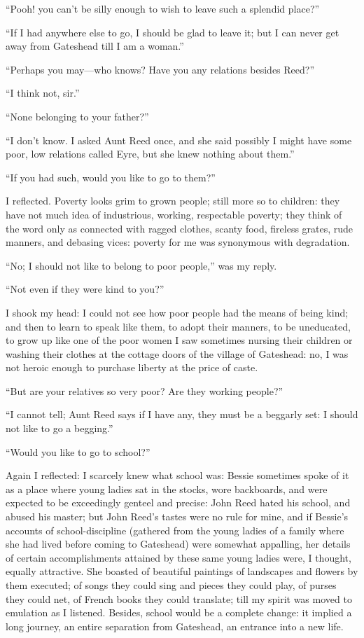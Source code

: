 \enquote{Pooh! you can't be silly enough to wish to leave such a
	splendid place?}

\enquote{If I had anywhere else to go, I should be glad to leave it; but
	I can never get away from Gateshead till I am a woman.}

\enquote{Perhaps you may---who knows?  Have you any relations besides
	\Mrs{} Reed?}

\enquote{I think not, sir.}

\enquote{None belonging to your father?}

\enquote{I don't know.  I asked Aunt Reed once, and she said possibly I
	might have some poor, low relations called Eyre, but she knew nothing
	about them.}

\enquote{If you had such, would you like to go to them?}

I reflected.  Poverty looks grim to grown people; still more so to
children: they have not much idea of industrious, working, respectable
poverty; they think of the word only as connected with ragged clothes,
scanty food, fireless grates, rude manners, and debasing vices: poverty
for me was synonymous with degradation.

\enquote{No; I should not like to belong to poor people,} was my reply.

\enquote{Not even if they were kind to you?}

I shook my head: I could not see how poor people had the means of being
kind; and then to learn to speak like them, to adopt their manners, to
be uneducated, to grow up like one of the poor women I saw sometimes
nursing their children or washing their clothes at the cottage doors of
the village of Gateshead: no, I was not heroic enough to purchase
liberty at the price of caste.

\enquote{But are your relatives so very poor?  Are they working people?}

\enquote{I cannot tell; Aunt Reed says if I have any, they must be a
	beggarly set: I should not like to go a begging.}

\enquote{Would you like to go to school?}

Again I reflected: I scarcely knew what school was: Bessie sometimes
spoke of it as a place where young ladies sat in the stocks, wore
backboards, and were expected to be exceedingly genteel and precise:
John Reed hated his school, and abused his master; but John Reed's
tastes were no rule for mine, and if Bessie's accounts of
school-discipline (gathered from the young ladies of a family where she
had lived before coming to Gateshead) were somewhat appalling, her
details of certain accomplishments attained by these same young ladies
were, I thought, equally attractive.  She boasted of beautiful paintings
of landscapes and flowers by them executed; of songs they could sing and
pieces they could play, of purses they could net, of French books they
could translate; till my spirit was moved to emulation as I listened.
Besides, school would be a complete change: it implied a long journey,
an entire separation from Gateshead, an entrance into a new life.

